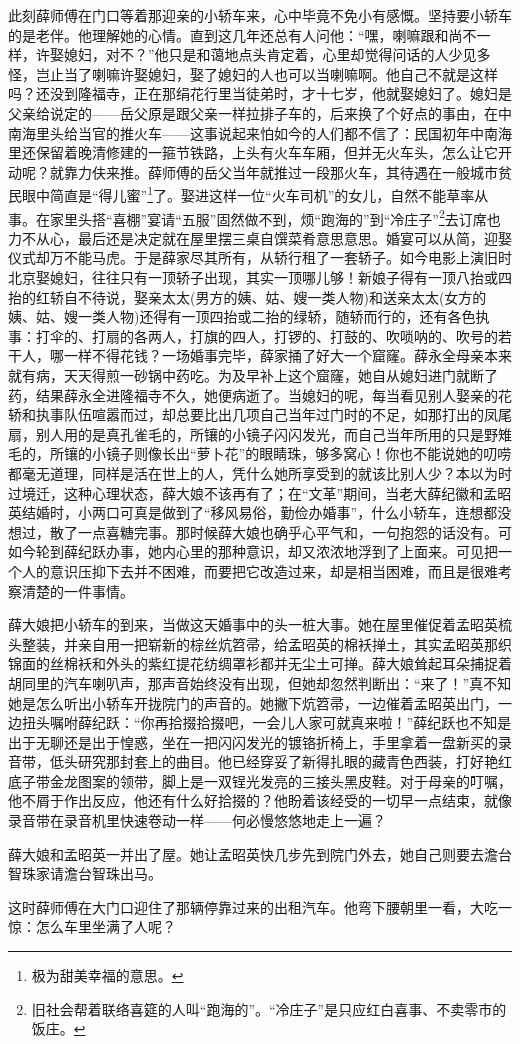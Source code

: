 \par 此刻薛师傅在门口等着那迎亲的小轿车来，心中毕竟不免小有感慨。坚持要小轿车的是老伴。他理解她的心情。直到这几年还总有人问他：“嘿，喇嘛跟和尚不一样，许娶媳妇，对不？”他只是和蔼地点头肯定着，心里却觉得问话的人少见多怪，岂止当了喇嘛许娶媳妇，娶了媳妇的人也可以当喇嘛啊。他自己不就是这样吗？还没到隆福寺，正在那绢花行里当徒弟时，才十七岁，他就娶媳妇了。媳妇是父亲给说定的——岳父原是跟父亲一样拉排子车的，后来换了个好点的事由，在中南海里头给当官的推火车——这事说起来怕如今的人们都不信了：民国初年中南海里还保留着晚清修建的一箍节铁路，上头有火车车厢，但并无火车头，怎么让它开动呢？就靠力伕来推。薛师傅的岳父当年就推过一段那火车，其待遇在一般城市贫民眼中简直是“得儿蜜”\footnote{极为甜美幸福的意思。}了。娶进这样一位“火车司机”的女儿，自然不能草率从事。在家里头搭“喜棚”宴请“五服”固然做不到，烦“跑海的”到“冷庄子”\footnote{旧社会帮着联络喜筵的人叫“跑海的”。“冷庄子”是只应红白喜事、不卖零市的饭庄。}去订席也力不从心，最后还是决定就在屋里摆三桌自馔菜肴意思意思。婚宴可以从简，迎娶仪式却万不能马虎。于是薛家尽其所有，从轿行租了一套轿子。如今电影上演旧时北京娶媳妇，往往只有一顶轿子出现，其实一顶哪儿够！新娘子得有一顶八抬或四抬的红轿自不待说，娶亲太太(男方的姨、姑、嫂一类人物)和送亲太太(女方的姨、姑、嫂一类人物)还得有一顶四抬或二抬的绿轿，随轿而行的，还有各色执事：打伞的、打扇的各两人，打旗的四人，打锣的、打鼓的、吹唢呐的、吹号的若干人，哪一样不得花钱？一场婚事完毕，薛家捅了好大一个窟窿。薛永全母亲本来就有病，天天得煎一砂锅中药吃。为及早补上这个窟窿，她自从媳妇进门就断了药，结果薛永全进隆福寺不久，她便病逝了。当媳妇的呢，每当看见别人娶亲的花轿和执事队伍喧嚣而过，却总要比出几项自己当年过门时的不足，如那打出的凤尾扇，别人用的是真孔雀毛的，所镶的小镜子闪闪发光，而自己当年所用的只是野雉毛的，所镶的小镜子则像长出“萝卜花”的眼睛珠，够多窝心！你也不能说她的叨唠都毫无道理，同样是活在世上的人，凭什么她所享受到的就该比别人少？本以为时过境迁，这种心理状态，薛大娘不该再有了；在“文革”期间，当老大薛纪徽和孟昭英结婚时，小两口可真是做到了“移风易俗，勤俭办婚事”，什么小轿车，连想都没想过，散了一点喜糖完事。那时候薛大娘也确乎心平气和，一句抱怨的话没有。可如今轮到薛纪跃办事，她内心里的那种意识，却又浓浓地浮到了上面来。可见把一个人的意识压抑下去并不困难，而要把它改造过来，却是相当困难，而且是很难考察清楚的一件事情。
\par 薛大娘把小轿车的到来，当做这天婚事中的头一桩大事。她在屋里催促着孟昭英梳头整装，并亲自用一把崭新的棕丝炕笤帚，给孟昭英的棉袄掸土，其实孟昭英那织锦面的丝棉袄和外头的紫红提花纺绸罩衫都并无尘土可掸。薛大娘耸起耳朵捕捉着胡同里的汽车喇叭声，那声音始终没有出现，但她却忽然判断出：“来了！”真不知她是怎么听出小轿车开拢院门的声音的。她撇下炕笤帚，一边催着孟昭英出门，一边扭头嘱咐薛纪跃：“你再拾掇拾掇吧，一会儿人家可就真来啦！”薛纪跃也不知是出于无聊还是出于惶惑，坐在一把闪闪发光的镀铬折椅上，手里拿着一盘新买的录音带，低头研究那封套上的曲目。他已经穿妥了新得扎眼的藏青色西装，打好艳红底子带金龙图案的领带，脚上是一双锃光发亮的三接头黑皮鞋。对于母亲的叮嘱，他不屑于作出反应，他还有什么好拾掇的？他盼着该经受的一切早一点结束，就像录音带在录音机里快速卷动一样——何必慢悠悠地走上一遍？
\par 薛大娘和孟昭英一并出了屋。她让孟昭英快几步先到院门外去，她自己则要去澹台智珠家请澹台智珠出马。
\par 这时薛师傅在大门口迎住了那辆停靠过来的出租汽车。他弯下腰朝里一看，大吃一惊：怎么车里坐满了人呢？


